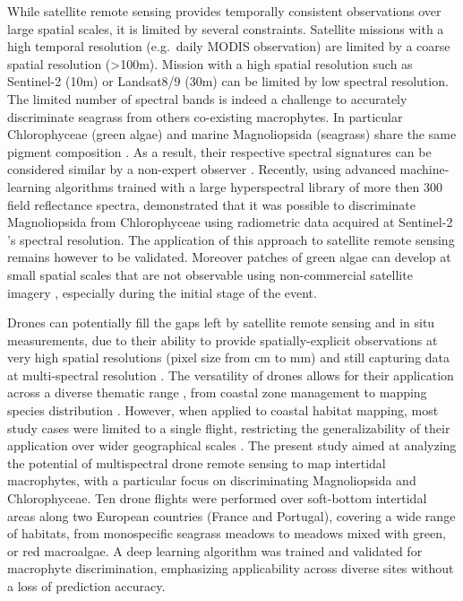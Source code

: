 \documentclass[
  number]{elsarticle}
\begin{document}
While satellite remote sensing provides temporally consistent
observations over large spatial scales, it is limited by several
constraints. Satellite missions with a high temporal resolution
(e.g.~daily MODIS observation) are limited by a coarse spatial
resolution (\textgreater100m). Mission with a high spatial resolution
such as Sentinel-2 (10m) or Landsat8/9 (30m) can be limited by low
spectral resolution. The limited number of spectral bands is indeed a
challenge to accurately discriminate seagrass from others co-existing
macrophytes. In particular Chlorophyceae (green algae) and marine
Magnoliopsida (seagrass) share the same pigment composition
\citetext{\citealp[ ]{ralph2002}; \citealp{Douay2022}}. As a result,
their respective spectral signatures can be considered similar by a
non-expert observer \citetext{\citealp[
]{Davies2023}; \citealp{bannari2022}}. Recently, using advanced
machine-learning algorithms trained with a large hyperspectral library
of more then 300 field reflectance spectra, \citep{Davies2023}
demonstrated that it was possible to discriminate Magnoliopsida from
Chlorophyceae using radiometric data acquired at Sentinel-2 's spectral
resolution. The application of this approach to satellite remote sensing
remains however to be validated. Moreover patches of green algae can
develop at small spatial scales that are not observable using
non-commercial satellite imagery \citep{tuya2013}, especially during the
initial stage of the event.

Drones can potentially fill the gaps left by satellite remote sensing
and in situ measurements, due to their ability to provide
spatially-explicit observations at very high spatial resolutions (pixel
size from cm to mm) and still capturing data at multi-spectral
resolution \citetext{\citealp[
]{fairley2022drone}; \citealp{oh2017use}}. The versatility of drones
allows for their application across a diverse thematic range , from
coastal zone management \citetext{\citealp[ ]{adade2021}; \citealp[
]{casella2020}; \citealp{angnuureng2022}} to mapping species
distribution \citetext{\citealp[ ]{joyce2023}; \citealp[
]{tallam2023}; \citealp[ ]{Roca2022}; \citealp[
]{Roman2021}; \citealp{Brunier2022Topographic}}. However, when applied
to coastal habitat mapping, most study cases were limited to a single
flight, restricting the generalizability of their application over wider
geographical scales \citetext{\citealp[ ]{Roman2021}; \citealp[
]{collin2019improving}; \citealp[
]{rossiter2020uav}; \citealp{Brunier2022Topographic}}. The present study
aimed at analyzing the potential of multispectral drone remote sensing
to map intertidal macrophytes, with a particular focus on discriminating
Magnoliopsida and Chlorophyceae. Ten drone flights were performed over
soft-bottom intertidal areas along two European countries (France and
Portugal), covering a wide range of habitats, from monospecific seagrass
meadows to meadows mixed with green, or red macroalgae. A deep learning
algorithm was trained and validated for macrophyte discrimination,
emphasizing applicability across diverse sites without a loss of
prediction accuracy.
\end{document}

